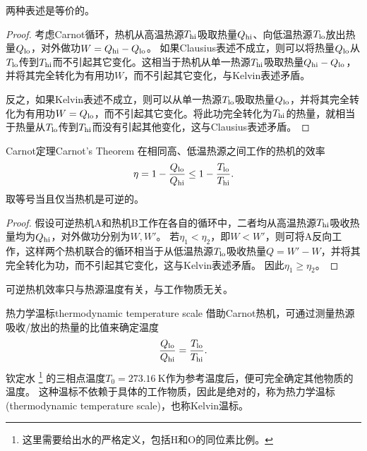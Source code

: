 \begin{corollary}
	两种表述是等价的。
\end{corollary}

\begin{proof}
	考虑Carnot循环，热机从高温热源$T_{\mathrm{hi}}$吸取热量$Q_{\mathrm{hi}}$、向低温热源$T_{\mathrm{lo}}$放出热量$Q_{\mathrm{lo}}$，对外做功$W=Q_{\mathrm{hi}}-Q_{\mathrm{lo}}$。
	如果Clausius表述不成立，则可以将热量$Q_{\mathrm{lo}}$从$T_{\mathrm{lo}}$传到$T_{\mathrm{hi}}$而不引起其它变化。这相当于热机从单一热源$T_{\mathrm{hi}}$吸取热量$Q_{\mathrm{hi}}-Q_{\mathrm{lo}}$，并将其完全转化为有用功$W$，而不引起其它变化，与Kelvin表述矛盾。

	反之，如果Kelvin表述不成立，则可以从单一热源$T_{\mathrm{lo}}$吸取热量$Q_{\mathrm{lo}}$，并将其完全转化为有用功$W=Q_{\mathrm{lo}}$，而不引起其它变化。将此功完全转化为$T_{\mathrm{hi}}$的热量，就相当于热量从$T_{\mathrm{lo}}$传到$T_{\mathrm{hi}}$而没有引起其他变化，这与Clausius表述矛盾。
\end{proof}

\begin{theorem}{Carnot定理}{Carnot's Theorem}
	在相同高、低温热源之间工作的热机的效率
	\begin{equation}
		\eta=1-\frac{Q_{\mathrm{lo}}}{Q_{\mathrm{hi}}}\leq1-\frac{T_{\mathrm{lo}}}{T_{\mathrm{hi}}}.
	\end{equation}
	取等号当且仅当热机是可逆的。
\end{theorem}

\begin{proof}
	假设可逆热机A和热机B工作在各自的循环中，二者均从高温热源$T_{\mathrm{hi}}$吸收热量均为$Q_{\mathrm{hi}}$，对外做功分别为$W,W'$。
	若$\eta_1<\eta_2$，即$W<W'$，则可将A反向工作，这样两个热机联合的循环相当于从低温热源$T_{\mathrm{lo}}$吸收热量$Q=W'-W$，并将其完全转化为功，而不引起其它变化，这与Kelvin表述矛盾。
	因此$\eta_1\geq\eta_2$。
\end{proof}

\begin{corollary}
	可逆热机效率只与热源温度有关，与工作物质无关。
\end{corollary}

\begin{definition}
	{热力学温标}{thermodynamic temperature scale}
	借助Carnot热机，可通过测量热源吸收/放出的热量的比值来确定温度
	\[
		\frac{Q_{\mathrm{lo}}}{Q_{\mathrm{hi}}}=\frac{T_{\mathrm{lo}}}{T_{\mathrm{hi}}}.
	\]
	钦定水
	\footnote{这里需要给出水的严格定义，包括H和O的同位素比例。
	}
	的三相点温度$T_0=\SI{273.16}{\kelvin}$作为参考温度后，便可完全确定其他物质的温度。
	这种温标不依赖于具体的工作物质，因此是绝对的，称为热力学温标(thermodynamic temperature scale)，也称Kelvin温标。
\end{definition}

